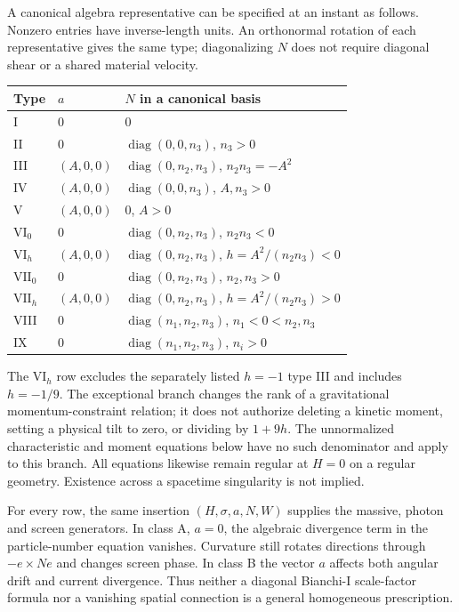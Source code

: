 A canonical algebra representative can be specified at an instant as follows. Nonzero entries have inverse-length units. An orthonormal rotation of each representative gives the same type; diagonalizing $N$ does not require diagonal shear or a shared material velocity.
\begin{center}
\begin{tabular}{lll}
\hline
Type & $a$ & $N$ in a canonical basis \\
\hline
I & $0$ & $0$ \\
II & $0$ & $\operatorname{diag}(0,0,n_3)$, $n_3>0$ \\
III & $(A,0,0)$ & $\operatorname{diag}(0,n_2,n_3)$, $n_2n_3=-A^2$ \\
IV & $(A,0,0)$ & $\operatorname{diag}(0,0,n_3)$, $A,n_3>0$ \\
V & $(A,0,0)$ & $0$, $A>0$ \\
$\mathrm{VI}_0$ & $0$ & $\operatorname{diag}(0,n_2,n_3)$, $n_2n_3<0$ \\
$\mathrm{VI}_h$ & $(A,0,0)$ & $\operatorname{diag}(0,n_2,n_3)$, $h=A^2/(n_2n_3)<0$ \\
$\mathrm{VII}_0$ & $0$ & $\operatorname{diag}(0,n_2,n_3)$, $n_2,n_3>0$ \\
$\mathrm{VII}_h$ & $(A,0,0)$ & $\operatorname{diag}(0,n_2,n_3)$, $h=A^2/(n_2n_3)>0$ \\
VIII & $0$ & $\operatorname{diag}(n_1,n_2,n_3)$, $n_1<0<n_2,n_3$ \\
IX & $0$ & $\operatorname{diag}(n_1,n_2,n_3)$, $n_i>0$ \\
\hline
\end{tabular}
\end{center}
The $\mathrm{VI}_h$ row excludes the separately listed $h=-1$ type III and includes $h=-1/9$. The exceptional branch changes the rank of a gravitational momentum-constraint relation; it does not authorize deleting a kinetic moment, setting a physical tilt to zero, or dividing by $1+9h$. The unnormalized characteristic and moment equations below have no such denominator and apply to this branch. All equations likewise remain regular at $H=0$ on a regular geometry. Existence across a spacetime singularity is not implied.

For every row, the same insertion $(H,\sigma,a,N,W)$ supplies the massive, photon and screen generators. In class A, $a=0$, the algebraic divergence term in the particle-number equation vanishes. Curvature still rotates directions through $-e\times Ne$ and changes screen phase. In class B the vector $a$ affects both angular drift and current divergence. Thus neither a diagonal Bianchi-I scale-factor formula nor a vanishing spatial connection is a general homogeneous prescription.

